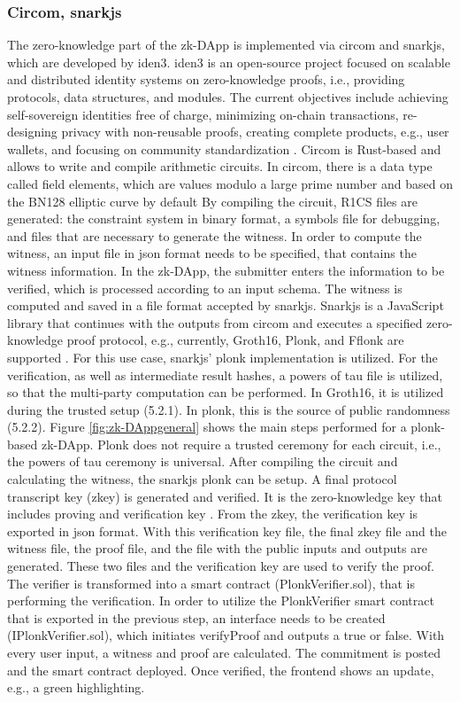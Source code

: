 \subsubsection{Circom, snarkjs}
The zero-knowledge part of the zk-DApp is implemented via circom and snarkjs, which are developed by iden3. iden3 is an open-source project focused on scalable and distributed identity systems on zero-knowledge proofs, i.e., providing protocols, data structures, and modules. The current objectives include achieving self-sovereign identities free of charge, minimizing on-chain transactions, re-designing privacy with non-reusable proofs, creating complete products, e.g., user wallets, and focusing on community standardization \citep{iden3aboutus}. Circom is Rust-based and allows to write and compile arithmetic circuits. In circom, there is a data type called field elements, which are values modulo a large prime number and based on the BN128 elliptic curve by default \citep{circom} By compiling the circuit, R1CS files are generated: the constraint system in binary format, a symbols file for debugging, and files that are necessary to generate the witness. In order to compute the witness, an input file in json format needs to be specified, that contains the witness information. In the zk-DApp, the submitter enters the information to be verified, which is processed according to an input schema. The witness is computed and saved in a file format accepted by snarkjs. Snarkjs is a JavaScript library that continues with the outputs from circom and executes a specified zero-knowledge proof protocol, e.g., currently, Groth16, Plonk, and Fflonk are supported \citep{snarkjsdoc}. For this use case, snarkjs' plonk implementation is utilized. For the verification, as well as intermediate result hashes, a powers of tau file is utilized, so that the multi-party computation can be performed. In Groth16, it is utilized during the trusted setup (5.2.1). In plonk, this is the source of public randomness (5.2.2). Figure \ref{fig:zk-DAppgeneral} shows the main steps performed for a plonk-based zk-DApp. Plonk does not require a trusted ceremony for each circuit, i.e., the powers of tau ceremony is universal. After compiling the circuit and calculating the witness, the snarkjs plonk can be setup. A final protocol transcript key (zkey) is generated and verified. It is the zero-knowledge key that includes proving and verification key \citep{snarkjsdoc}. From the zkey, the verification key is exported in json format. With this verification key file, the final zkey file and the witness file, the proof file, and the file with the public inputs and outputs are generated. These two files and the verification key are used to verify the proof. The verifier is transformed into a smart contract (PlonkVerifier.sol), that is performing the verification. In order to utilize the PlonkVerifier smart contract that is exported in the previous step, an interface needs to be created (IPlonkVerifier.sol), which initiates verifyProof and outputs a true or false. With every user input, a witness and proof are calculated. The commitment is posted and the smart contract deployed. Once verified, the frontend shows an update, e.g., a green highlighting. 
